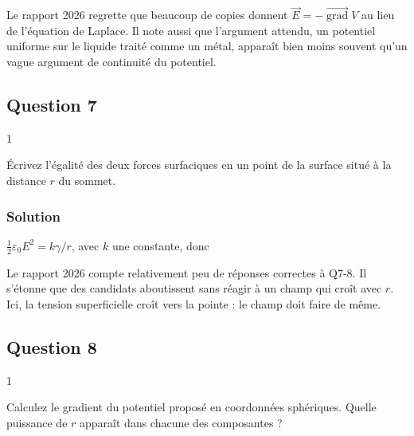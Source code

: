 \documentclass[11pt,a4paper]{article}
\newcommand{\equationajustee}[1]{%
  \sbox{\boiteequation}{$\displaystyle #1$}%
  \ifdim\wd\boiteequation>\linewidth
    \[\resizebox{\linewidth}{!}{\usebox{\boiteequation}}\]%
  \else
    \[#1\]%
  \fi}
\begin{document}
\begin{jury}

Le rapport 2026 regrette que beaucoup de copies donnent \(\vec E=-\overrightarrow{\operatorname{grad}}V\) au lieu de l'équation de Laplace. Il note aussi que l'argument attendu, un potentiel uniforme sur le liquide traité comme un métal, apparaît bien moins souvent qu'un vague argument de continuité du potentiel.

\end{jury}

\hypertarget{question-7}{%
\subsection{Question 7}\label{question-7}}

\begin{indication}{1}

Écrivez l'égalité des deux forces surfaciques en un point de la surface situé à la distance \(r\) du sommet.

\end{indication}

\hypertarget{solution-6}{%
\subsubsection{Solution}\label{solution-6}}

\(\frac12\varepsilon_0E^2=k\gamma/r\), avec \(k\) une constante, donc

\equationajustee{\boxed{E\propto r^{-1/2}}}

\begin{jury}

Le rapport 2026 compte relativement peu de réponses correctes à Q7-8. Il s'étonne que des candidats aboutissent sans réagir à un champ qui croît avec \(r\). Ici, la tension superficielle croît vers la pointe : le champ doit faire de même.

\end{jury}

\hypertarget{question-8}{%
\subsection{Question 8}\label{question-8}}

\begin{indication}{1}

Calculez le gradient du potentiel proposé en coordonnées sphériques. Quelle puissance de \(r\) apparaît dans chacune des composantes ?

\end{indication}
\end{document}
